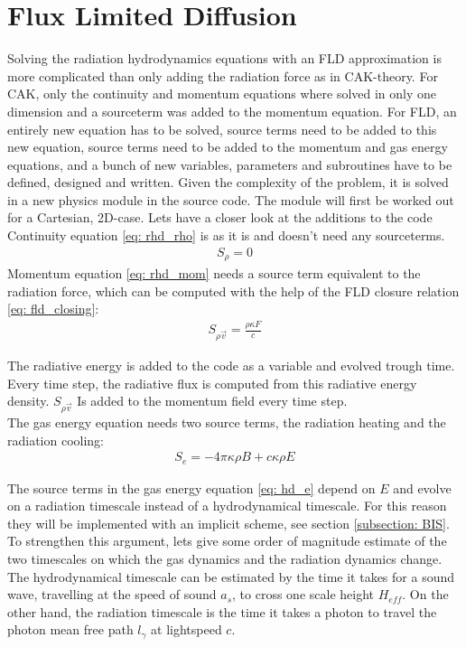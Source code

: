 \section{Flux Limited Diffusion} \label{section: m: FLD}
Solving the radiation hydrodynamics equations with an FLD approximation is more complicated than only adding the radiation force as in CAK-theory. For CAK, only the continuity and momentum equations where solved in only one dimension and a sourceterm was added to the momentum equation. For FLD, an entirely new equation has to be solved, source terms need to be added to this new equation, source terms need to be added to the momentum and gas energy equations, and a bunch of new variables, parameters and subroutines have to be defined, designed and written. Given the complexity of the problem, it is solved in a new physics module in the source code. The module will first be worked out for a Cartesian, 2D-case. Lets have a closer look at the additions to the code \\

Continuity equation \eqref{eq: rhd_rho} is as it is and doesn't need any sourceterms.
\begin{align}
S_{\rho} = 0
\end{align}
Momentum equation \eqref{eq: rhd_mom} needs a source term equivalent to the radiation force, which can be computed with the help of the FLD closure relation \eqref{eq: fld_closing}:
\begin{align}
S_{\rho \vec{v}} = \frac{\rho \kappa F}{c}
\end{align}

The radiative energy is added to the code as a variable and evolved trough time. Every time step, the radiative flux is computed from this radiative energy density. $S_{\rho \vec{v}}$ Is added to the momentum field every time step.\\

The gas energy equation needs two source terms, the radiation heating and the radiation cooling:
\begin{align}
S_{e} = -4\pi \kappa \rho B + c \kappa \rho E 
\end{align}

The source terms in the gas energy equation \eqref{eq: hd_e} depend on $E$ and evolve on a radiation timescale instead of a hydrodynamical timescale. For this reason they will be implemented with an implicit scheme, see section \ref{subsection: BIS}.\\

To strengthen this argument, lets give some order of magnitude estimate of the two timescales on which the gas dynamics and the radiation dynamics change. The hydrodynamical timescale can be estimated by the time it takes for a sound wave, travelling at the speed of sound $a_s$, to cross one scale height $H_{eff}$. On the other hand, the radiation timescale is the time it takes a photon to travel the photon mean free path $l_\gamma$ at lightspeed $c$.

